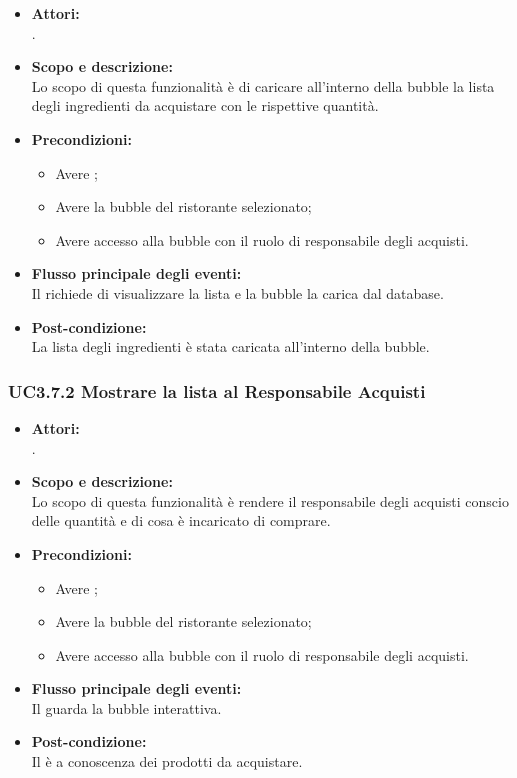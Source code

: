 \begin{itemize}
	\item \textbf{Attori:}
	\\.
	\item \textbf{Scopo e descrizione:} 
	\\Lo scopo di questa funzionalità è di caricare all’interno della bubble la lista degli ingredienti da acquistare con le rispettive quantità.
	\item \textbf{Precondizioni:}
	\begin{itemize}
		\item Avere ;
		\item Avere la bubble del ristorante selezionato;
		\item Avere accesso alla bubble con il ruolo di responsabile degli acquisti.
	\end{itemize}
	\item \textbf{Flusso principale degli eventi:}
	\\Il {} richiede di visualizzare la lista e la bubble la carica dal database.
	\item \textbf{Post-condizione:}
	\\La lista degli ingredienti è stata caricata all’interno della bubble.
\end{itemize}

\subsubsection{UC3.7.2 Mostrare la lista al Responsabile Acquisti} \label{UC3.7.2}

\begin{itemize}
	\item \textbf{Attori:}
	\\.
	\item \textbf{Scopo e descrizione:} 
	\\Lo scopo di questa funzionalità è rendere il responsabile degli acquisti conscio delle quantità e di cosa è incaricato di comprare.
	\item \textbf{Precondizioni:}
	\begin{itemize}
		\item Avere ;
		\item Avere la bubble del ristorante selezionato;
		\item Avere accesso alla bubble con il ruolo di responsabile degli acquisti.
	\end{itemize}
	\item \textbf{Flusso principale degli eventi:}
	\\Il {} guarda la bubble interattiva.
	\item \textbf{Post-condizione:}
	\\Il {} è a conoscenza dei prodotti da acquistare.
\end{itemize}

